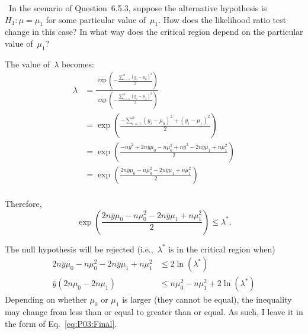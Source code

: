 \begin{problem}
  ~In the scenario of Question~6.5.3, suppose the alternative hypothesis is ${H_1: \mu = \mu_1}$ for some particular value of~$\mu_1$. How does the likelihood ratio test change in this case? In what way does the critical region depend on the particular value of~$\mu_1$?
\end{problem}

The value of~$\lambda$ becomes:
\begin{align}
  \lambda &= \frac{\exp\left( - \frac{\sum_{i=1}^{n} (y_i - \mu_0)^{2}}{2} \right) }{\exp\left( - \frac{\sum_{i=1}^{n} (y_i - \mu_1)^{2}}{2} \right) } \\
          &= \exp\left( \frac{ -\sum_{i=1}^{n} (y_i - \mu_0)^{2} + (y_i - \mu_1)^{2} }{2} \right) \\
          &= \exp\left( \frac{ -n\bar{y}^2 +2n\bar{y}\mu_0 - n\mu_0^{2} + n\bar{y}^2 - 2n\bar{y}\mu_1 + n\mu_1^{2} }{2} \right) \\
          &= \exp\left( \frac{ 2n\bar{y}\mu_0 - n\mu_0^{2} - 2n\bar{y}\mu_1 + n\mu_1^{2} }{2} \right) \\
\end{align}

Therefore,
\begin{equation}
  \exp\left( \frac{ 2n\bar{y}\mu_0 - n\mu_0^{2} - 2n\bar{y}\mu_1 + n\mu_1^{2} }{2} \right) \leq \lambda^* \text{.}
\end{equation}

The null hypothesis will be rejected (i.e.,~$\lambda^{*}$ is in the critical region when)
\begin{align}
  2n\bar{y}\mu_0 - n\mu_0^{2} - 2n\bar{y}\mu_1 + n\mu_1^{2} &\leq 2\ln (\lambda^*) \\
  \bar{y} (2n \mu_0 - 2n\mu_1) &\leq n\mu_0^{2} - n\mu_1^{2} + 2\ln (\lambda^*)\label{eq:P03:Final}
\end{align}
Depending on whether $\mu_0$ or $\mu_1$ is larger (they cannot be equal), the inequality may change from less than or equal to greater than or equal.  As such, I leave it in the form of Eq.~\eqref{eq:P03:Final}.
